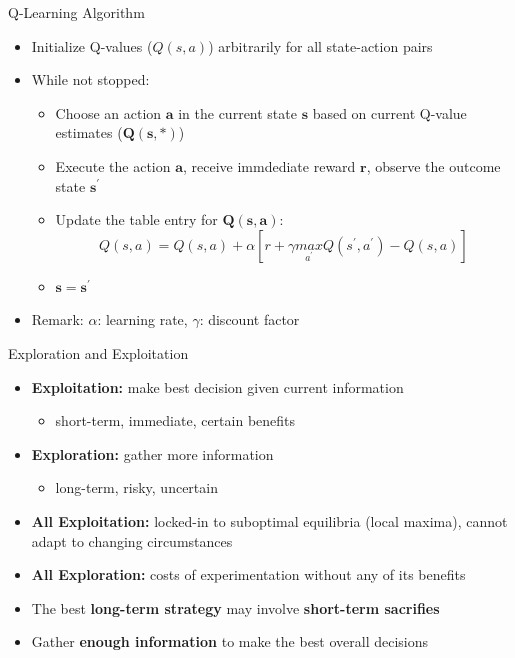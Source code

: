 \documentclass{beamer}
\begin{document}
\begin{frame}{Q-Learning Algorithm}
\begin{itemize}
\item{Initialize Q-values ($Q(s,a)$) arbitrarily for all state-action pairs}
\item{While not stopped:}
\begin{itemize}
\item{Choose an action $\boldsymbol{a}$ in the current state $\boldsymbol{s}$ based on current Q-value estimates ($\bm{Q(s,*)}$)}
\item{Execute the action $\boldsymbol{a}$, receive immdediate reward $\bm{r}$, observe the outcome state $\bm{s^\prime}$}
\item{Update the table entry for $\bm{Q(s,a)}$: \\
$$Q(s,a) = Q(s,a) + \alpha[r + \gamma\underset{a^\prime}{max}Q(s^\prime, a^\prime) - Q(s,a)] $$ }
\item{$\bm{s} = \bm{s^\prime}$}
\end{itemize}
\item{Remark: $\alpha$: learning rate, $\gamma$: discount factor} 
\end{itemize}
\end{frame}



\begin{frame}{Exploration and Exploitation}
\begin{itemize}
\item{\textbf{\color{blue}Exploitation:} make best decision given current information}
\begin{itemize}
\item{short-term, immediate, certain benefits}
\end{itemize}
\item{\textbf{\color{blue}Exploration:} gather more information}
\begin{itemize}
\item{long-term, risky, uncertain}
\end{itemize}
\item{\textbf{All Exploitation:} locked-in to suboptimal equilibria (local maxima), cannot adapt to changing circumstances }
\item{\textbf{All Exploration:} costs of experimentation without any of its benefits}
\item{The best \textbf{long-term strategy} may involve \textbf{short-term sacrifies}}
\item{Gather \textbf{enough information} to make the best overall decisions}
\end{itemize}
\end{frame}
\end{document}
